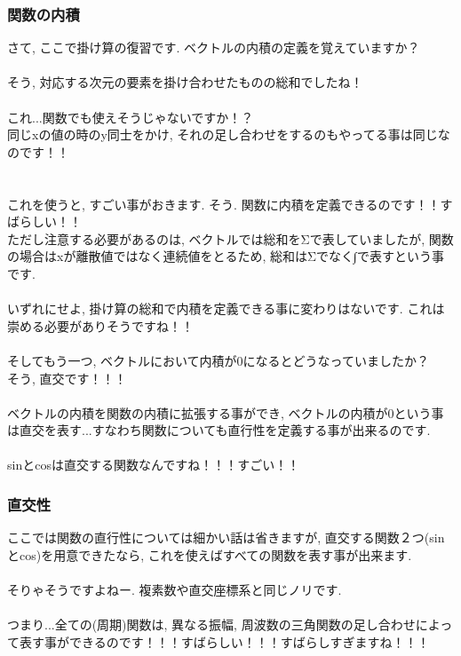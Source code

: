 \documentclass[11pt,a4paper]{jsarticle}
\begin{document}
\subsubsection{関数の内積}
さて, ここで掛け算の復習です. ベクトルの内積の定義を覚えていますか？\\
\\
そう, 対応する次元の要素を掛け合わせたものの総和でしたね！\\
\\
これ...関数でも使えそうじゃないですか！？\\
同じxの値の時のy同士をかけ, それの足し合わせをするのもやってる事は同じなのです！！\\
\\
\\
これを使うと, すごい事がおきます. そう. 関数に内積を定義できるのです！！すばらしい！！\\
ただし注意する必要があるのは, ベクトルでは総和をΣで表していましたが, 関数の場合はxが離散値ではなく連続値をとるため, 総和はΣでなく∫で表すという事です.\\
\\
いずれにせよ, 掛け算の総和で内積を定義できる事に変わりはないです. これは崇める必要がありそうですね！！\\
\\
そしてもう一つ, ベクトルにおいて内積が0になるとどうなっていましたか？\\
そう, 直交です！！！\\
\\
ベクトルの内積を関数の内積に拡張する事ができ, ベクトルの内積が0という事は直交を表す...すなわち関数についても直行性を定義する事が出来るのです.\\
\\
sinとcosは直交する関数なんですね！！！すごい！！\\

\subsubsection{直交性}
ここでは関数の直行性については細かい話は省きますが, 直交する関数２つ(sinとcos)を用意できたなら, これを使えばすべての関数を表す事が出来ます.\\
\\
そりゃそうですよねー. 複素数や直交座標系と同じノリです.\\
\\
つまり...全ての(周期)関数は, 異なる振幅, 周波数の三角関数の足し合わせによって表す事ができるのです！！！すばらしい！！！すばらしすぎますね！！！\\
\\
\end{document}
